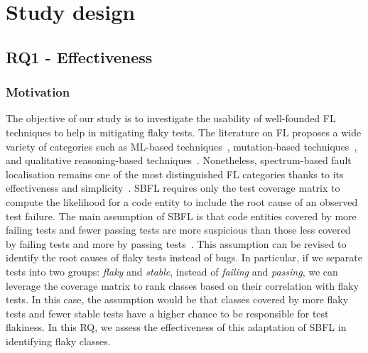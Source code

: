 \section{Study design}
\label{sec:sherloc-design}












\subsection{RQ1 - Effectiveness}\label{sub:rq1_effectiveness}
\subsubsection{Motivation}\label{subsub:rq1_motivation}
The objective of our study is to investigate the usability of well-founded FL techniques to help in mitigating flaky tests.
The literature on FL proposes a wide variety of categories such as ML-based techniques~\cite{Lou:2021:fse,Li:2019:issta,briand2007}, mutation-based techniques~\cite{Papadakis:2015sf,Hong:2015db}, and qualitative reasoning-based techniques~\cite{perez2018leveraging}.
Nonetheless, spectrum-based fault localisation remains one of the most distinguished FL categories thanks to its effectiveness and simplicity~\cite{wong2016survey}. %
SBFL requires only the test coverage matrix to compute the likelihood for a code entity to include the root cause of an observed test failure. 
The main assumption of SBFL is that code entities covered by more failing tests and fewer passing tests are more suspicious than those less covered by failing tests and more by passing tests~\cite{renieres2003fault}.
This assumption can be revised to identify the root causes of flaky tests instead of bugs.
In particular, if we separate tests into two groups: \textit{flaky} and \textit{stable}, instead of \textit{failing} and \textit{passing}, we can leverage the coverage matrix to rank classes based on their correlation with flaky tests. 
In this case, the assumption would be that classes covered by more flaky tests and fewer stable tests have a higher chance to be responsible for test flakiness.
In this RQ, we assess the effectiveness of this adaptation of SBFL in identifying flaky classes. 


